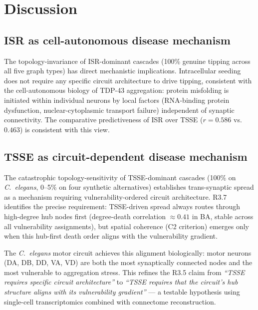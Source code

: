 \documentclass[12pt,a4paper]{article}
\begin{document}
\section{Discussion}

\subsection{ISR as cell-autonomous disease mechanism}

The topology-invariance of ISR-dominant cascades (100\% genuine tipping across all five graph
types) has direct mechanistic implications. Intracellular seeding does not require any specific
circuit architecture to drive tipping, consistent with the cell-autonomous biology of TDP-43
aggregation: protein misfolding is initiated within individual neurons by local factors
(RNA-binding protein dysfunction, nuclear-cytoplasmic transport failure) independent of
synaptic connectivity. The comparative predictiveness of ISR over TSSE ($r = 0.586$ vs.\
$0.463$) is consistent with this view.

\subsection{TSSE as circuit-dependent disease mechanism}

The catastrophic topology-sensitivity of TSSE-dominant cascades (100\% on \textit{C.~elegans},
0--5\% on four synthetic alternatives) establishes trans-synaptic spread as a mechanism
requiring vulnerability-ordered circuit architecture. R3.7 identifies the precise requirement:
TSSE-driven spread always routes through high-degree hub nodes first (degree-death correlation
$\approx 0.41$ in BA, stable across all vulnerability assignments), but spatial coherence
(C2 criterion) emerges only when this hub-first death order aligns with the vulnerability
gradient.

The \textit{C.~elegans} motor circuit achieves this alignment biologically: motor neurons
(DA, DB, DD, VA, VD) are both the most synaptically connected nodes and the most vulnerable
to aggregation stress. This refines the R3.5 claim from \emph{``TSSE requires specific circuit
architecture''} to \emph{``TSSE requires that the circuit's hub structure aligns with its
vulnerability gradient''} --- a testable hypothesis using single-cell transcriptomics combined
with connectome reconstruction.
\end{document}
